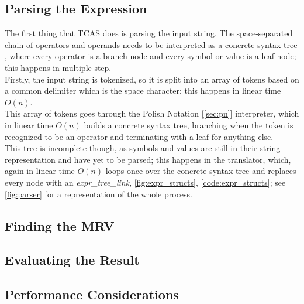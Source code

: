 \documentclass{article}
\theoremstyle{plain}
\theoremstyle{definition}
\begin{document}
	\subsection{Parsing the Expression}
	
	The first thing that TCAS does is parsing the input string. The space-separated chain of operators and operands needs to be interpreted as a concrete syntax tree \cite{wiki:parsetree}\cite{wiki:abtree}, where every operator is a branch node and every symbol or value is a leaf node; this happens in multiple step.\\
	Firstly, the input string is tokenized, so it is split into an array of tokens based on a common delimiter which is the space character; this happens in linear time \(O(n)\). \\
	This array of tokens goes through the Polish Notation [\ref{sec:pn}] interpreter, which in linear time \(O(n)\) builds a concrete syntax tree, branching when the token is recognized to be an operator and terminating with a leaf for anything else. \\
	This tree is incomplete though, as symbols and values are still in their string representation and have yet to be parsed; this happens in the translator, which, again in linear time \(O(n)\) loops once over the concrete syntax tree and replaces every node with an \textit{expr\_tree\_link}, \cref{fig:expr_structs}, \cref{code:expr_structs}; see \cref{fig:parser} for a representation of the whole process.
	
	\subsection{Finding the MRV}
	
	
	
	\subsection{Evaluating the Result}
	
	\subsection{Performance Considerations}
	
	\newpage
	\printbibliography
	
\end{document}
